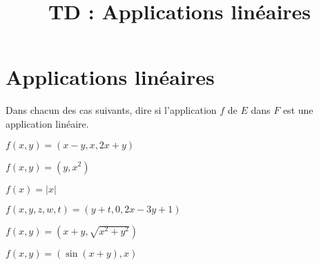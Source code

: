 \documentclass[a4paper, 11pt,reqno]{article}
\newcommand{\type}{TD }
\begin{document}
\title{\type  : Applications linéaires }



\vspace{0.2cm}



\noindent\section{\large{Applications lin\'eaires}}
\begin{exercice}  \;
	Dans chacun des cas suivants, dire si l'application $f$ de $E$ dans $F$ est une application lin\'eaire.
	\begin{enumerate}
		\begin{minipage}[t]{0.45\textwidth}
			\item $f(x,y)=(x-y,x,2x+y)$
			\item $f(x,y)=(y,x^2)$
			\item $f(x)=|x|$
		\end{minipage}
		\quad
		\begin{minipage}[t]{0.45\textwidth}
			\item $f(x,y,z,w,t)=(y+t,0,2x-3y+1)$
			\item $f(x,y)=(x+y,\sqrt{x^2+y^2})$
			\item $f(x,y)=(\sin{(x+y)},x)$
		\end{minipage}
	\end{enumerate}
\end{exercice}
\end{document}
